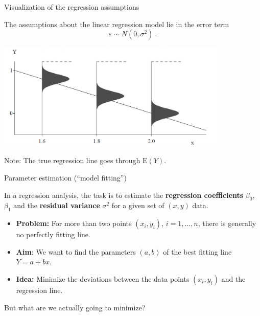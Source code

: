 \documentclass[10pt,ignorenonframetext,]{beamer}
\providecommand{\tightlist}{%
  \setlength{\itemsep}{0pt}\setlength{\parskip}{0pt}}
\begin{document}
\begin{frame}

\begin{block}{Visualization of the regression assumptions}

The assumptions about the linear regression model lie in the error term
\[\varepsilon \sim N(0,\sigma^2) \ . \]

\vspace{-2mm} \includegraphics[width=11cm]{pictures/regrAssumptions.jpg}

Note: The true regression line goes through \(\text{E}(Y)\).

\end{block}

\end{frame}

\begin{frame}

\begin{block}{Parameter estimation (``model fitting'')}

\vspace{2mm}

In a regression analysis, the task is to estimate the \textbf{regression
coefficients} \(\beta_0\), \(\beta_1\) and the \textbf{residual
variance} \(\sigma^2\) for a given set of \((x,y)\) data.

\vspace{4mm}

\begin{itemize}
\item
  \textbf{Problem:} For more than two points \((x_i,y_i)\),
  \(i=1,\ldots, n\), there is generally no perfectly fitting line.
  \vspace{2mm}
\item
  \textbf{Aim}: We want to find the parameters \((a,b)\) of the best
  fitting line \(Y = a + b x\).
\end{itemize}

\vspace{2mm}

\begin{itemize}
\tightlist
\item
  \textbf{Idea:} Minimize the deviations between the data points
  \((x_i,y_i)\) and the regression line.
\end{itemize}

\vspace{4mm}

But what are we actually going to minimize?

\end{block}

\end{frame}
\end{document}

